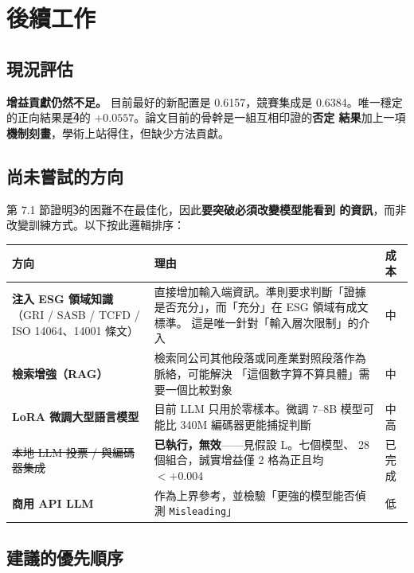 \documentclass[11pt,a4paper]{ctexart}
\newcommand{\fn}[1]{\texttt{#1}}
\begin{document}
\section{後續工作}

\subsection{現況評估}

\textbf{增益貢獻仍然不足。} 目前最好的新配置是 0.6157，競賽集成是 0.6384。唯一穩定
的正向結果是\textcircled{4}的 $+0.0557$。論文目前的骨幹是一組互相印證的\textbf{否定
結果}加上一項\textbf{機制刻畫}，學術上站得住，但缺少方法貢獻。

\subsection{尚未嘗試的方向}

第 7.1 節證明\textcircled{3}的困難不在最佳化，因此\textbf{要突破必須改變模型能看到
的資訊}，而非改變訓練方式。以下按此邏輯排序：

\begin{table}[h]
\centering\small
\begin{tabular}{@{}p{3.6cm}p{8.2cm}p{1.6cm}@{}}
\toprule
方向 & 理由 & 成本 \\
\midrule
\textbf{注入 ESG 領域知識}（GRI / SASB / TCFD / ISO 14064、14001 條文） &
直接增加輸入端資訊。準則要求判斷「證據是否充分」，而「充分」在 ESG 領域有成文標準。
這是唯一針對「輸入層次限制」的介入 & 中 \\
\addlinespace
\textbf{檢索增強（RAG）} & 檢索同公司其他段落或同產業對照段落作為脈絡，可能解決
「這個數字算不算具體」需要一個比較對象 & 中 \\
\addlinespace
\textbf{LoRA 微調大型語言模型} & 目前 LLM 只用於零樣本。微調 7--8B 模型可能比 340M
編碼器更能捕捉判斷 & 中高 \\
\addlinespace
\sout{本地 LLM 投票 / 與編碼器集成} & \textbf{已執行，無效}——見假設 L。七個模型、
28 個組合，誠實增益僅 2 格為正且均 $< +0.004$ & 已完成 \\
\addlinespace
\textbf{商用 API LLM} & 作為上界參考，並檢驗「更強的模型能否偵測 \fn{Misleading}」
& 低 \\
\bottomrule
\end{tabular}
\end{table}

\subsection{建議的優先順序}
\end{document}

